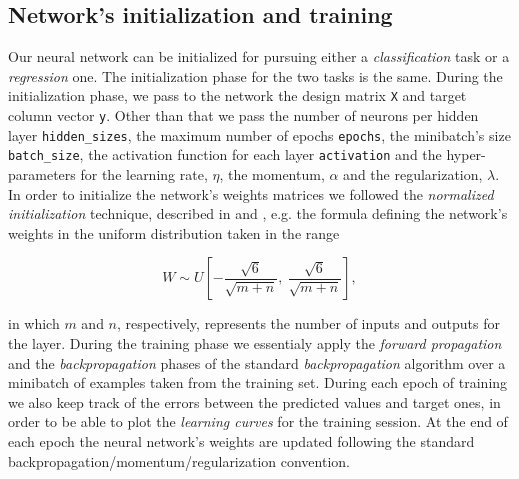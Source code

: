 \documentclass[11pt,twoside]{article}
\begin{document}
        \subsection{Network's initialization and training} %
        \label{sub:the_training_algorithm}
        Our neural network can be initialized for pursuing either a \textit{classification} task or a
        \textit{regression} one. The initialization phase for the two tasks is the same.
        During the initialization phase, we pass to the network the design matrix \texttt{X} and target column
        vector \texttt{y}. Other than that we pass the number of neurons per hidden layer
        \texttt{hidden\_sizes}, the maximum number of epochs \texttt{epochs}, the minibatch's size
        \texttt{batch\_size}, the activation function for each layer \texttt{activation} and the hyper-parameters
        for the learning rate, \texttt{$\eta$}, the momentum, \texttt{$\alpha$} and the regularization,
        \texttt{$\lambda$}. In order to initialize the network's weights matrices we followed the
        \textit{normalized initialization} technique, described in \cite{deep_learning} and
        \cite{initialization}, e.g. the formula defining the network's weights in the uniform distribution
        taken in the range

        \begin{equation*}
             W \sim U \left [ - \frac{\sqrt{6}}{\sqrt{m + n}}, \ \frac{\sqrt{6}}{\sqrt{m + n}}  \right ],
        \end{equation*}

        in which $m$ and $n$, respectively, represents the number of inputs and outputs for the layer.
        During the training phase we essentialy apply the \textit{forward propagation} and the
        \textit{backpropagation} phases of the standard \textit{backpropagation} algorithm over a minibatch of
        examples taken from the training set. During each epoch of training we also keep track of the errors
        between the predicted values and target ones, in order to be able to plot the \textit{learning curves}
        for the training session. At the end of each epoch the neural network's weights are updated following
        the standard backpropagation/momentum/regularization convention.

\end{document}
